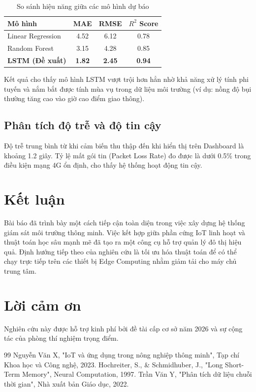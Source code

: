 \documentclass[11pt,a4paper]{article} %
\begin{document}
\begin{table}[h]
\centering
\caption{So sánh hiệu năng giữa các mô hình dự báo}
\label{table:results}
\vspace{0.3cm}
\begin{tabular}{lccc}
\toprule
\textbf{Mô hình} & \textbf{MAE} & \textbf{RMSE} & \textbf{$R^2$ Score} \\
\midrule
Linear Regression & 4.52 & 6.12 & 0.78 \\
Random Forest & 3.15 & 4.28 & 0.85 \\
\textbf{LSTM (Đề xuất)} & \textbf{1.82} & \textbf{2.45} & \textbf{0.94} \\
\bottomrule
\end{tabular}
\end{table}

Kết quả cho thấy mô hình LSTM vượt trội hơn hẳn nhờ khả năng xử lý tính phi tuyến và nắm bắt được tính mùa vụ trong dữ liệu môi trường (ví dụ: nồng độ bụi thường tăng cao vào giờ cao điểm giao thông).

\subsection{Phân tích độ trễ và độ tin cậy}
Độ trễ trung bình từ khi cảm biến thu thập đến khi hiển thị trên Dashboard là khoảng 1.2 giây. Tỷ lệ mất gói tin (Packet Loss Rate) đo được là dưới 0.5\% trong điều kiện mạng 4G ổn định, cho thấy hệ thống hoạt động tin cậy.

\section{Kết luận}
Bài báo đã trình bày một cách tiếp cận toàn diện trong việc xây dựng hệ thống giám sát môi trường thông minh. Việc kết hợp giữa phần cứng IoT linh hoạt và thuật toán học sâu mạnh mẽ đã tạo ra một công cụ hỗ trợ quản lý đô thị hiệu quả. Định hướng tiếp theo của nghiên cứu là tối ưu hóa thuật toán để có thể chạy trực tiếp trên các thiết bị Edge Computing nhằm giảm tải cho máy chủ trung tâm.

\section*{Lời cảm ơn}
Nghiên cứu này được hỗ trợ kinh phí bởi đề tài cấp cơ sở năm 2026 và sự cộng tác của phòng thí nghiệm trọng điểm.

\begin{thebibliography}{99}
 Nguyễn Văn X, "IoT và ứng dụng trong nông nghiệp thông minh", Tạp chí Khoa học và Công nghệ, 2023.
 Hochreiter, S., \& Schmidhuber, J., "Long Short-Term Memory", Neural Computation, 1997.
 Trần Văn Y, "Phân tích dữ liệu chuỗi thời gian", Nhà xuất bản Giáo dục, 2022.
\end{thebibliography}
\end{document}
